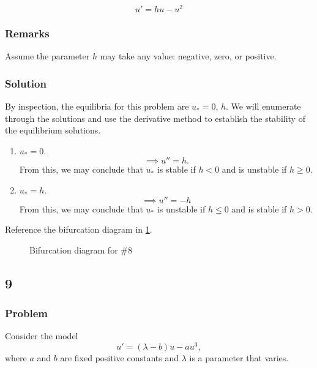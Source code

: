 \documentclass[12pt]{article}
\begin{document}
\begin{equation}
  \label{eq:8a-problem}
  u'=hu-u^2
\end{equation}

\subsubsection*{Remarks}
Assume the parameter $h$ may take any value: negative, zero, or positive.

\subsubsection*{Solution}
By inspection, the equilibria for this problem are $u_*=0,\,h$. We will
enumerate through the solutions and use the derivative method to establish the
stability of the equilibrium solutions.
\begin{enumerate}
\item $u_*=0$.
  $$\implies u''=h.$$ From this, we may conclude that $u_*$ is stable if $h<0$
  and is unstable if $h\ge0$.
\item $u_*=h$.
  $$\implies u''=-h$$ From this, we may conclude that $u_*$ is unstable if $h\le0$
  and is stable if $h>0$.
\end{enumerate}
Reference the bifurcation diagram in \cref{fig:8-bifurcation-diagram}.

\begin{figure}
  \centering
  \caption{Bifurcation diagram for \#8}
  \label{fig:8-bifurcation-diagram}
\end{figure}

\subsection{9}
\subsubsection*{Problem}
Consider the model
\begin{equation}
  \label{eq:9-problem}
  u'=(\lambda - b) u-au^3,
\end{equation}
where $a$ and $b$ are fixed positive constants and $\lambda$ is a parameter that
varies.
\end{document}
